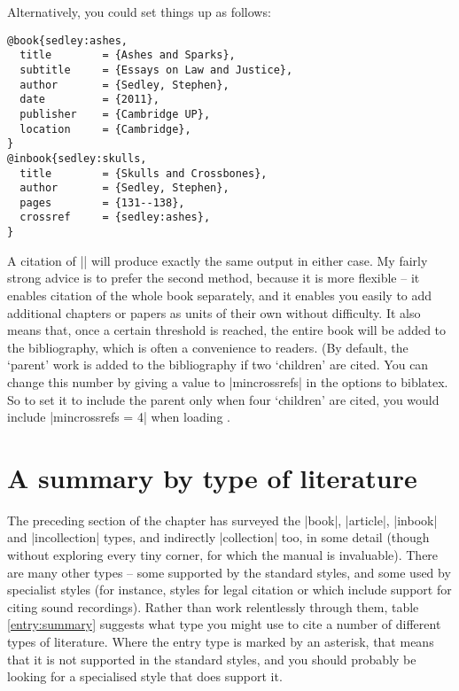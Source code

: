 {Alternatively, you could set things up as follows:
\begin{Verbatim}
@book{sedley:ashes,
  title        = {Ashes and Sparks},
  subtitle     = {Essays on Law and Justice},
  author       = {Sedley, Stephen},
  date         = {2011},
  publisher    = {Cambridge UP},
  location     = {Cambridge},
}
@inbook{sedley:skulls,
  title        = {Skulls and Crossbones},
  author       = {Sedley, Stephen},
  pages        = {131--138},
  crossref     = {sedley:ashes},
}
\end{Verbatim}

A citation of |\cite{sedley:ashes}| will produce exactly the same
output in either case. My fairly strong advice is to prefer the second
method, because it is more flexible -- it enables citation of the
whole book separately, and it enables you easily to add additional
chapters or papers as units of their own without difficulty. It also
means that, once a certain threshold is reached, the entire book will
be added to the bibliography, which is often a convenience to
readers. (By default, the `parent' work is added to the bibliography
if two `children' are cited. You can change this number by giving a
value to |mincrossrefs| in the options to biblatex. So to set it to
include the parent only when four `children' are cited, you would
include |mincrossrefs = 4| when loading \biblatex.

\section{A summary by type of literature}

The preceding section of the chapter has surveyed the |book|,
|article|, |inbook| and |incollection| types, and indirectly
|collection| too, in some detail (though without exploring every tiny
corner, for which the manual is invaluable). There are many other
types -- some supported by the standard styles, and some used by
specialist styles (for instance, styles for legal citation or which
include support for citing sound recordings). Rather than work
relentlessly through them, table \ref{entry:summary} suggests what
type you might use to cite a number of different types of
literature. Where the entry type is marked by an asterisk, that means
that it is not supported in the standard styles, and you should
probably be looking for a specialised style that does support it.

}
